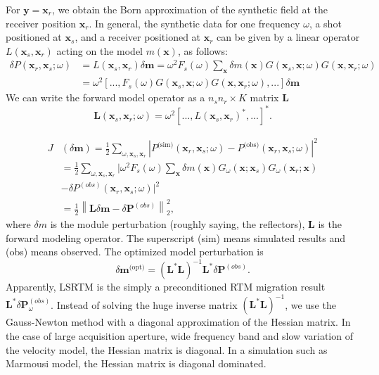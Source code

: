 \documentclass[11pt]{article}
\newcommand{\bx}{\boldsymbol{x}}
\newcommand{\by}{\boldsymbol{y}}
\newcommand{\bL}{\boldsymbol{L}}
\newcommand{\bm}{\boldsymbol{m}}
\newcommand{\bP}{\boldsymbol{P}}
\theoremstyle{plain}
\theoremstyle{definition}
\theoremstyle{remark}
\numberwithin{equation}{section}
\begin{document}
For $\by=\bx_r$, we obtain the Born approximation of the synthetic field at the receiver position $\bx_r$. In general, the synthetic data for one frequency $\omega$, a shot positioned at $\bx_s$, and a receiver positioned at $\bx_r$ can be given by a linear operator $L(\bx_s,\bx_r)$ acting on the model $m(\bx)$, as follows:
\begin{align}
\delta P(\bx_r,\bx_s;\omega)&=L(\bx_s,\bx_r)\delta \bm=\omega^2 F_s(\omega)\sum_{\bx}\delta m(\bx)G(\bx_s,\bx;\omega)G(\bx,\bx_r;\omega)\nonumber\\
&=\omega^2 [...,F_s(\omega)G(\bx_s,\bx;\omega)G(\bx,\bx_r;\omega),...]\delta \bm
\end{align} 
We can write the forward model operator as a $n_s n_r\times K$ matrix $\bL$
\begin{equation}
\label{eq:operatorL}
\bL(\bx_s,\bx_r;\omega) = \omega^2 [...,L(\bx_s,\bx_r)^*,...]^*.
\end{equation}

  \begin{equation}
  \begin{aligned}
  J&(\delta \bm) = \frac{1}{2} \sum\limits_{\omega,\bx_s,\bx_r}  \left| P^{\text{(sim)}}(\bx_r, \bx_s; \omega) - P^{\text{(obs)}}(\bx_r, \bx_s; \omega) \right|^2 \\
  &= \frac{1}{2} \sum\limits_{\omega,\bx_s,\bx_r} \Big| \omega^2 F_s(\omega) \sum\limits_{\bx}\delta m(\bx)G_{\omega}(\bx; \bx_s)G_{\omega}(\bx_r; \bx) \\&- \delta P^{(obs)}(\bx_r, \bx_s; \omega) \Big|^2\\
  &= \frac{1}{2} \left\| \bL\delta \bm - \delta\bP^{(obs)}\right\|_2^2,
  \end{aligned}
  \end{equation}
  where $\delta m$ is the module perturbation (roughly saying, the reflectors), $\bL$ is the forward modeling operator. The superscript (sim) means simulated results and (obs) means
  observed. The optimized model perturbation is 
    \begin{equation}
    \delta \bm^{\text{(opt)}} = \left( \bL^{*}\bL \right)^{-1} \bL^{*} \delta\bP^{(obs)}.
    \end{equation}
    Apparently, LSRTM is the simply a preconditioned RTM migration result $\bL^{*}\delta \bP^{(obs)}_{\omega}$. 
    Instead of solving the huge inverse matrix $(\bL^{*}\bL)^{-1}$,  we use the Gauss-Newton method with a diagonal approximation 
    of the Hessian matrix. In the case of large acquisition aperture, wide frequency band and slow variation of the velocity model, the Hessian matrix
    is diagonal. In a simulation such as Marmousi model, the Hessian matrix is diagonal dominated. 
\end{document}
